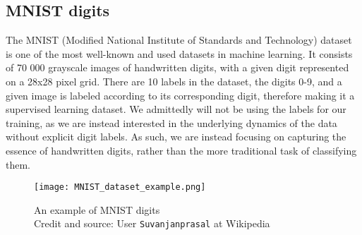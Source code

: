 \documentclass{article}
\begin{document}
\subsection{MNIST digits}
The MNIST (Modified National Institute of Standards and Technology) dataset is one of the most well-known and used datasets in machine learning. It consists of 70 000 grayscale images of handwritten digits, with a given digit represented on a 28x28 pixel grid. There are 10 labels in the dataset, the digits 0-9, and a given image is labeled according to its corresponding digit, therefore making it a supervised learning dataset. 
\newline
We admittedly will not be using the labels for our training, as we are instead interested in the underlying dynamics of the data without explicit digit labels. As such, we are instead focusing on capturing the essence of handwritten digits, rather than the more traditional task of classifying them.
\begin{figure}[ht!]
    \centering
    \texttt{[image: MNIST\_dataset\_example.png]}
    \caption{An example of MNIST digits \\
        Credit and source: User \texttt{Suvanjanprasal} at Wikipedia}
    \label{figExample}
\end{figure}
\newpage
\end{document}
